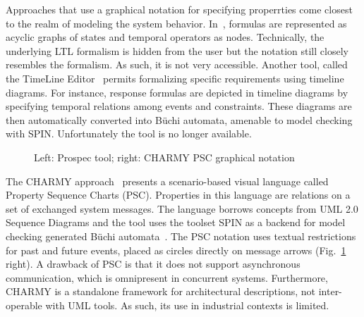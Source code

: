 \documentclass[letter]{llncs}
\begin{document}
Approaches that use a graphical notation for specifying properrties
come closest to the realm of modeling the system behavior.
In~\cite{Lee97agraphical}, formulas are represented as acyclic graphs of
states and temporal operators as nodes.  Technically, the underlying LTL
formalism is hidden from the user but the notation still closely resembles
the formalism.  As such, it is not very accessible.  Another tool,
called the TimeLine Editor~\cite{Smith:2001:ECG:882477.883639} permits
formalizing specific requirements using timeline diagrams. For instance,
response formulas are depicted in timeline diagrams by specifying
temporal relations among events and constraints.  These diagrams are
then automatically converted into B\"uchi automata, amenable to model
checking with SPIN.  Unfortunately the tool is no longer available.
\begin{figure}[h!]
  \centering
  \hfill
  \caption{Left: Prospec tool; right: CHARMY PSC graphical notation}
  \label{fig:Approaches}
\end{figure}
The CHARMY approach~\cite{Autili:2007:GSS:1290845.1290859} presents
a scenario-based visual language called Property Sequence Charts
(PSC). Properties in this language are relations on a set of exchanged
system messages. The language borrows concepts from UML 2.0 Sequence
Diagrams and the tool uses the toolset SPIN as a backend for model checking
generated B\"uchi automata~\cite{Giannakopoulou:2001:AVT:872023.872506}.
The PSC notation uses textual restrictions for past and future events,
placed as circles directly on message arrows (Fig.~\ref{fig:Approaches}
right). A drawback of PSC is that it does not support asynchronous
communication, which is omnipresent in concurrent systems.  Furthermore,
CHARMY is a standalone framework for architectural descriptions, not
inter-operable with UML tools. As such, its use in industrial contexts
is limited.
\end{document}
